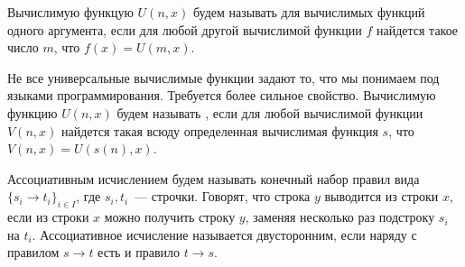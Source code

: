 





\setcounter{curtask}{22}


\begin{definition*}
    Вычислимую функцую $U(n, x)$ будем называть  для вычислимых
    функций одного аргумента, если для любой другой вычислимой функции $f$ найдется такое число $m$, что
    $f(x) = U(m, x)$.

    Не все универсальные вычислимые функции задают то, что мы понимаем под языками
    программирования. Требуется более сильное свойство. Вычислимую функцию $U(n, x)$ будем называть
    , если для любой вычислимой функции $V(n, x)$ найдется такая всюду
    определенная вычислимая функция $s$, что $V(n, x) = U(s(n), x)$.
\end{definition*}


\begin{definition*}
    Ассоциативным исчислением будем называть конечный набор правил вида $\{s_i \to t_i\}_{i \in I}$, где
    $s_i, t_i$~--- строчки. Говорят, что строка $y$ выводится из строки $x$, если из строки $x$ можно
    получить строку $y$, заменяя несколько раз подстроку $s_i$ на $t_i$. Ассоциативное исчисление
    называется двусторонним, если наряду с правилом $s \to t$ есть и правило $t \to s$.
\end{definition*}



\breakline







